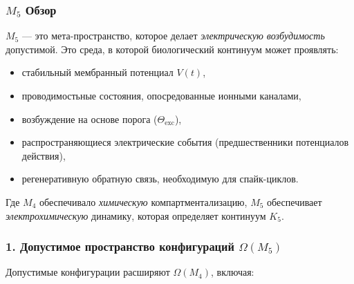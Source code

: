 

\subsubsection{\texorpdfstring{$M_5$}{M_5} Обзор}
\label{sec:m5-overview}

$M_5$ — это мета-пространство, которое делает \emph{электрическую возбудимость} допустимой.
Это среда, в которой биологический континуум может проявлять:

\begin{itemize}
    \item стабильный мембранный потенциал $V(t)$,
    \item проводимостьные состояния, опосредованные ионными каналами,
    \item возбуждение на основе порога ($\Theta_{\mathrm{exc}}$),
    \item распространяющиеся электрические события (предшественники потенциалов действия),
    \item регенеративную обратную связь, необходимую для спайк-циклов.
\end{itemize}

Где $M_4$ обеспечивало \emph{химическую} компартментализацию,
$M_5$ обеспечивает \emph{электрохимическую} динамику, которая определяет континуум $K_5$.

\subsubsection*{1. Допустимое пространство конфигураций \texorpdfstring{$\Omega(M_5)$}{\Omega(M_5)}}

Допустимые конфигурации расширяют $\Omega(M_4)$, включая:

